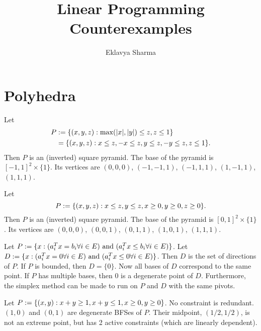 \documentclass[a4paper,12pt,fleqn]{article}
\author{Eklavya Sharma}
\date{\empty}
\title{Linear Programming Counterexamples}
\begin{document}
\maketitle
\setlength{\parskip}{0.2em}

\section{Polyhedra}

\begin{example}
\label{ex:pyramid-1}
Let
\begin{align*}
P &:= \{(x, y, z): \max(|x|, |y|) \le z, z \le 1\}
\\ &= \{(x, y, z): x \le z, -x \le z, y \le z, -y \le z, z \le 1\}.
\end{align*}
Then $P$ is an (inverted) square pyramid.
The base of the pyramid is $[-1, 1]^2 \times \{1\}$.
Its vertices are $(0, 0, 0)$, $(-1, -1, 1)$, $(-1, 1, 1)$, $(1, -1, 1)$, $(1, 1, 1)$.
\end{example}

\begin{example}
\label{ex:pyramid-2}
Let
\[ P := \{(x, y, z): x \le z, y \le z, x \ge 0, y \ge 0, z \ge 0\}. \]
Then $P$ is an (inverted) square pyramid.
The base of the pyramid is $[0, 1]^2 \times \{1\}$.
Its vertices are $(0, 0, 0)$, $(0, 0, 1)$, $(0, 1, 1)$, $(1, 0, 1)$, $(1, 1, 1)$.
\end{example}

\begin{example}
Let $P := \{x: (a_i^Tx = b_i \forall i \in E) \textrm{ and } (a_i^Tx \le b_i \forall i \in E)\}$.
Let $D := \{x: (a_i^Tx = 0 \forall i \in E) \textrm{ and } (a_i^Tx \le 0 \forall i \in E)\}$.
Then $D$ is the set of directions of $P$. If $P$ is bounded, then $D = \{0\}$.
Now all bases of $D$ correspond to the same point.
If $P$ has multiple bases, then $0$ is a degenerate point of $D$.
Furthermore, the simplex method can be made to run on $P$ and $D$ with the same pivots.
\end{example}

\begin{example}
Let $P := \{(x, y): x + y \ge 1, x + y \le 1, x \ge 0, y \ge 0\}$.
No constraint is redundant.
$(1,0)$ and $(0,1)$ are degenerate BFSes of $P$.
Their midpoint, $(1/2, 1/2)$, is not an extreme point, but has 2 active constraints
(which are linearly dependent).
\end{example}
\end{document}
